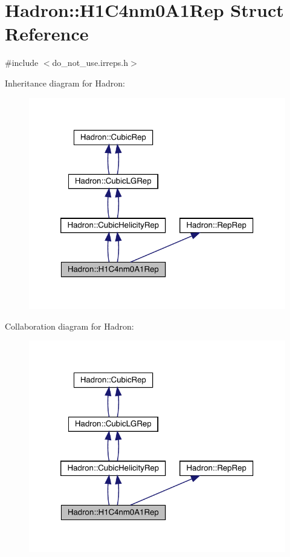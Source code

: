 \hypertarget{structHadron_1_1H1C4nm0A1Rep}{}\section{Hadron\+:\+:H1\+C4nm0\+A1\+Rep Struct Reference}
\label{structHadron_1_1H1C4nm0A1Rep}


{\ttfamily \#include $<$do\+\_\+not\+\_\+use.\+irreps.\+h$>$}



Inheritance diagram for Hadron\+:\nopagebreak
\begin{figure}[H]
\begin{center}
\leavevmode
\includegraphics[width=320pt]{dc/daa/structHadron_1_1H1C4nm0A1Rep__inherit__graph}
\end{center}
\end{figure}


Collaboration diagram for Hadron\+:\nopagebreak
\begin{figure}[H]
\begin{center}
\leavevmode
\includegraphics[width=320pt]{d9/d3a/structHadron_1_1H1C4nm0A1Rep__coll__graph}
\end{center}
\end{figure}
